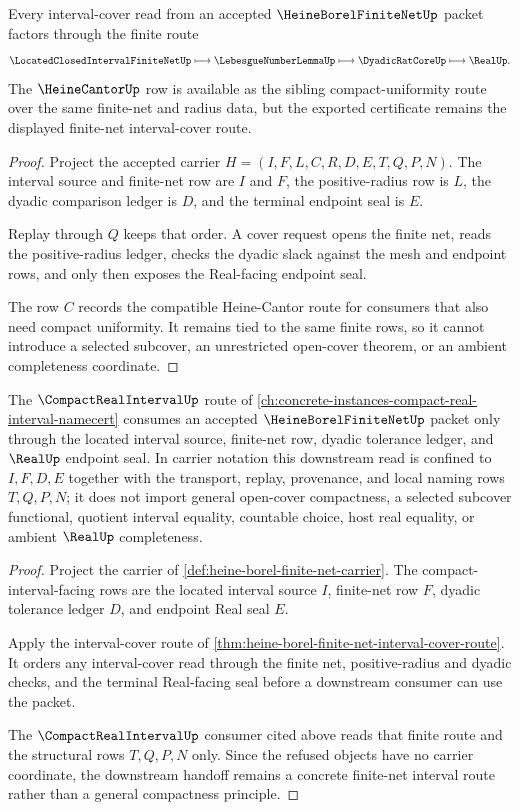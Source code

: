\begin{theorem}
\label{thm:heine-borel-finite-net-interval-cover-route}
Every interval-cover read from an accepted $\HeineBorelFiniteNetUp$ packet factors through the finite route
$$
\LocatedClosedIntervalFiniteNetUp \longmapsto \LebesgueNumberLemmaUp \longmapsto \DyadicRatCoreUp \longmapsto \RealUp .
$$
The $\HeineCantorUp$ row is available as the sibling compact-uniformity route over the same finite-net and radius data, but the exported certificate remains the displayed finite-net interval-cover route.
\end{theorem}
\begin{proof}
Project the accepted carrier $H=(I,F,L,C,R,D,E,T,Q,P,N)$. The interval source and finite-net row are $I$ and $F$, the positive-radius row is $L$, the dyadic comparison ledger is $D$, and the terminal endpoint seal is $E$.

Replay through $Q$ keeps that order. A cover request opens the finite net, reads the positive-radius ledger, checks the dyadic slack against the mesh and endpoint rows, and only then exposes the Real-facing endpoint seal.

The row $C$ records the compatible Heine-Cantor route for consumers that also need compact uniformity. It remains tied to the same finite rows, so it cannot introduce a selected subcover, an unrestricted open-cover theorem, or an ambient completeness coordinate.
\end{proof}

\begin{theorem}
\label{thm:heine-borel-finite-net-compact-interval-consumer}
The $\CompactRealIntervalUp$ route of \autoref{ch:concrete-instances-compact-real-interval-namecert} consumes an accepted $\HeineBorelFiniteNetUp$ packet only through the located interval source, finite-net row, dyadic tolerance ledger, and $\RealUp$ endpoint seal. In carrier notation this downstream read is confined to $I,F,D,E$ together with the transport, replay, provenance, and local naming rows $T,Q,P,N$; it does not import general open-cover compactness, a selected subcover functional, quotient interval equality, countable choice, host real equality, or ambient $\RealUp$ completeness.
\end{theorem}
\begin{proof}
Project the carrier of \autoref{def:heine-borel-finite-net-carrier}. The compact-interval-facing rows are the located interval source $I$, finite-net row $F$, dyadic tolerance ledger $D$, and endpoint Real seal $E$.

Apply the interval-cover route of \autoref{thm:heine-borel-finite-net-interval-cover-route}. It orders any interval-cover read through the finite net, positive-radius and dyadic checks, and the terminal Real-facing seal before a downstream consumer can use the packet.

The $\CompactRealIntervalUp$ consumer cited above reads that finite route and the structural rows $T,Q,P,N$ only. Since the refused objects have no carrier coordinate, the downstream handoff remains a concrete finite-net interval route rather than a general compactness principle.
\end{proof}

